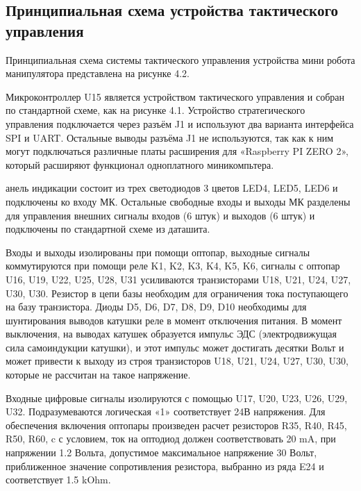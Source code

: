  
\subsection{ Принципиальная схема устройства тактического управления }
Принципиальная схема системы тактического управления устройства мини робота манипулятора представлена на рисунке 4.2.

Микроконтроллер U15 является устройством тактического управления и собран по стандартной схеме, как на рисунке 4.1.  Устройство стратегического управления подключается через разъём J1 и используют два варианта интерфейса SPI и UART. Остальные выводы разъёма J1 не используются, так как к ним могут подключаться различные платы расширения для «Raspberry PI ZERO 2», который расширяют функционал одноплатного миникомпьтера.

анель индикации состоит из трех светодиодов 3 цветов LED4, LED5, LED6 и подключены ко входу МК. Остальные свободные входы и выходы МК разделены для управления внешних сигналы входов (6 штук) и выходов (6 штук) и подключены по стандартной схеме из даташита. 

Входы и выходы изолированы при помощи оптопар, выходные сигналы коммутируются при помощи реле K1, K2, K3, K4, K5, K6, сигналы с оптопар U16, U19, U22, U25, U28, U31 усиливаются транзисторами U18, U21, U24, U27, U30, U30. Резистор в цепи базы необходим для ограничения тока поступающего на базу транзистора. Диоды D5, D6, D7, D8, D9, D10 необходимы для шунтирования выводов катушки реле в момент отключения питания. В момент выключения, на выводах катушек образуется импульс ЭДС (электродвижущая сила самоиндукции катушки), и этот импульс может достигать десятки Вольт и может привести к выходу из строя транзисторов U18, U21, U24, U27, U30, U30, которые не рассчитан на такое напряжение. 

Входные цифровые сигналы изолируются с помощью U17, U20, U23, U26, U29, U32.  Подразумеваются логическая «1» соответствует 24В напряжения. Для обеспечения включения оптопары произведен расчет резисторов R35, R40, R45, R50, R60, c с условием, ток на оптодиод должен соответствовать 20 mA, при напряжении 1.2 Вольта, допустимое максимальное напряжение 30 Вольт, приближенное значение сопротивления резистора, выбранно из ряда E24 и соответствует 1.5 kOhm. 